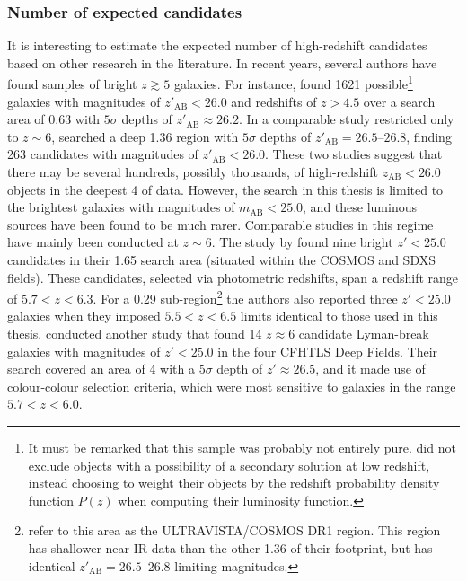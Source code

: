 \subsubsection{Number of expected candidates}\label{subsubsection:expected_number}
It is interesting to estimate the expected number of \DESVIDEO high-redshift candidates based on other research in the literature. In recent years, several authors have found samples of bright $z\gtrsim5$ galaxies. For instance, \cite{2009MNRAS.395.2196M} found 1621 possible\footnote{It must be remarked that this sample was probably not entirely pure. \cite{2009MNRAS.395.2196M} did not exclude objects with a possibility of a secondary solution at low redshift, instead choosing to weight their objects by the redshift probability density function $P(z)$ when computing their luminosity function.} galaxies with magnitudes of $z'_{\mathrm{AB}}< 26.0$ and redshifts of $z>4.5$ over a search area of \SI{0.63}{\sqdeg} with $5\sigma$ depths of $z'_{\mathrm{AB}}\approx26.2$. In a comparable study restricted only to $z\sim6$, \cite{2015MNRAS.452.1817B} searched a deep \SI{1.36}{\sqdeg} region with $5\sigma$ depths of $z'_{\mathrm{AB}}=\numrange[range-phrase = \text{--}, list-units = single]{26.5}{26.8}$, finding 263 candidates with magnitudes of $z'_{\mathrm{AB}}< 26.0$. These two studies suggest that there may be several hundreds, possibly thousands, of high-redshift $z_{\mathrm{AB}}<{26.0}$ objects in the deepest \SI{4}{\sqdeg} of \DESVIDEO data.  However, the search in this thesis is limited to the brightest galaxies with magnitudes of $m_{\mathrm{AB}}< 25.0$, and these luminous sources have been found to be much rarer. Comparable studies in this regime have mainly been conducted at $z\sim6$. The study by \cite{2015MNRAS.452.1817B} found nine bright $z'< 25.0$ candidates in their \SI{1.65}{\sqdeg} search area (situated within the COSMOS and SDXS fields). These candidates, selected via photometric redshifts, span a redshift range of $5.7 <  z <  6.3$. For a \SI{0.29}{\sqdeg} sub-region\footnote{\cite{2015MNRAS.452.1817B} refer to this area as the ULTRAVISTA/COSMOS DR1 region. This region has shallower near-IR data than the other \SI{1.36}{\sqdeg} of their footprint, but has identical $z'_{\mathrm{AB}}= \numrange[range-phrase = \text{--}, list-units = single]{26.5}{26.8}$ limiting magnitudes.} the authors also reported three $z'< 25.0$ galaxies when they imposed $5.5 <  z <  6.5$ limits identical to those used in this thesis. \cite{2013AJ....145....4W} conducted another study that found 14 $z\approx6$ candidate Lyman-break galaxies with magnitudes of $z'< 25.0$ in the four CFHTLS Deep Fields. Their search covered an area of \SI{4}{\sqdeg} with a $5\sigma$ depth of $z'\approx26.5$, and it made use of colour-colour selection criteria, which were most sensitive to galaxies in the range $5.7< z< 6.0$. \par 


